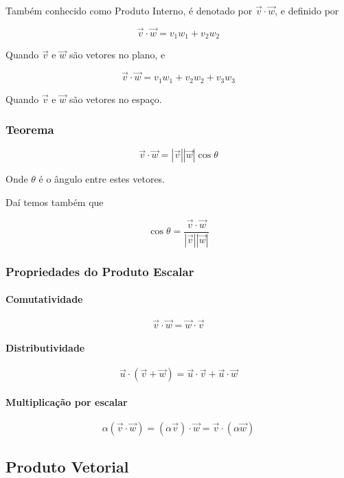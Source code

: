 Também conhecido como Produto Interno, é denotado por
$\vec{v} \cdot \vec{w}$, e definido por

\[
\vec{v} \cdot \vec{w} = v_1 w_1 + v_2 w_2
\]

Quando $\vec{v}$ e $\vec{w}$ são vetores no plano, e

\[
\vec{v} \cdot \vec{w} = v_1 w_1 + v_2 w_2 + v_3 w_3
\]

Quando $\vec{v}$ e $\vec{w}$ são vetores no espaço.

\subsubsection{Teorema}\label{teorema}

\[
\vec{v} \cdot \vec{w} = |\vec{v}| |\vec{w}| \cos \theta
\]

Onde $\theta$ é o ângulo entre estes vetores.

Daí temos também que

\[
\cos \theta = \frac{\vec{v} \cdot \vec{w}}{|\vec{v}| |\vec{w}|}
\]

\subsubsection{Propriedades do Produto
Escalar}\label{propriedades-do-produto-escalar}

\paragraph{Comutatividade}\label{comutatividade-1}

\[
\vec{v} \cdot \vec{w} = \vec{w} \cdot \vec{v}
\]

\paragraph{Distributividade}\label{distributividade-1}

\[
\vec{u} \cdot (\vec{v} + \vec{w}) = \vec{u} \cdot \vec{v} + \vec{u} \cdot \vec{w}
\]

\paragraph{Multiplicação por
escalar}\label{multiplicauxe7uxe3o-por-escalar}

\[
\alpha (\vec{v} \cdot \vec{w}) = (\alpha \vec{v}) \cdot \vec{w} = \vec{v} \cdot (\alpha \vec{w})
\]

\subsection{Produto Vetorial}\label{produto-vetorial}

